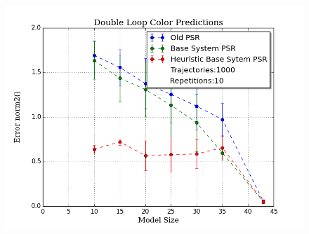 \documentclass{beamer}
\begin{document}
\begin{frame}
\begin{columns}[c]
\begin{figure}
\includegraphics[width=1.0\linewidth]{uCOREPICS/MultipleObservationsHeuristics.png}
\end{figure}


\end{columns}

\end{frame}

\end{document}
